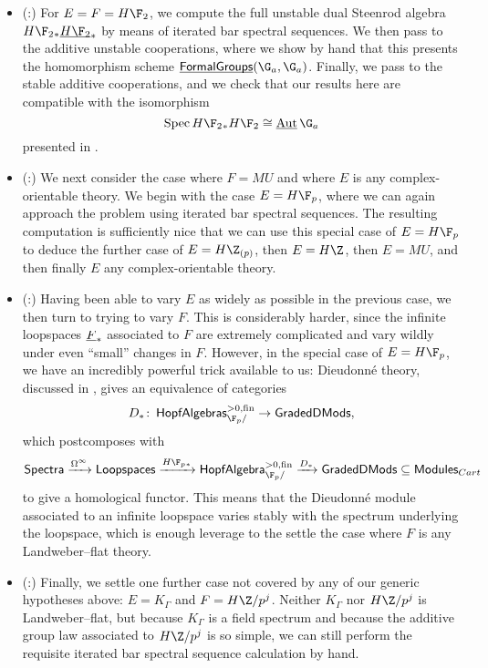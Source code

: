 \begin{itemize}
\item (:) For $E = F = H\F_2$, we compute the full unstable dual Steenrod algebra $H\F_2{}_* \OS{H\F_2}{*}$ by means of iterated bar spectral sequences.  We then pass to the additive unstable cooperations, where we show by hand that this presents the homomorphism scheme $\InternalHom{FormalGroups}(\G_a, \G_a)$.  Finally, we pass to the stable additive cooperations, and we check that our results here are compatible with the isomorphism \[\Spec H\F_2{}_* H\F_2 \cong \InternalAut{\G_a}\] presented in .
\item (:) We next consider the case where $F = MU$ and where $E$ is any complex-orientable theory.  We begin with the case $E = H\F_p$, where we can again approach the problem using iterated bar spectral sequences.  The resulting computation is sufficiently nice that we can use this special case of $E = H\F_p$ to deduce the further case of $E = H\Z_{(p)}$, then $E = H\Z$, then $E = MU$, and then finally $E$ any complex-orientable theory.
\item (:) Having been able to vary $E$ as widely as possible in the previous case, we then turn to trying to vary $F$.  This is considerably harder, since the infinite loopspaces $\underline{\smash{F}}_{*}$ associated to $F$ are extremely complicated and vary wildly under even ``small'' changes in $F$.  However, in the special case of $E = H\F_p$, we have an incredibly powerful trick available to us: Dieudonn\'e theory, discussed in , gives an equivalence of categories \[D_*\co \CatOf{HopfAlgebras}^{> 0, \fin}_{\F_p/} \to \CatOf{GradedDMods},\] which postcomposes with \[\CatOf{Spectra} \xrightarrow{\Loops^\infty} \CatOf{Loopspaces} \xrightarrow{H\F_p{}_*} \CatOf{HopfAlgebra}^{>0, \fin}_{\F_p/} \xrightarrow{D_*} \CatOf{GradedDMods} \subseteq \CatOf{Modules}_{Cart}\]  to give a homological functor.  This means that the Dieudonn\'e module associated to an infinite loopspace varies stably with the spectrum underlying the loopspace, which is enough leverage to the settle the case where $F$ is any Landweber--flat theory.
\item (:) Finally, we settle one further case not covered by any of our generic hypotheses above: $E = K_\Gamma$ and $F = H\Z/p^j$.  Neither $K_\Gamma$ nor $H\Z/p^j$ is Landweber--flat, but because $K_\Gamma$ is a field spectrum and because the additive group law associated to $H\Z/p^j$ is so simple, we can still perform the requisite iterated bar spectral sequence calculation by hand.
\end{itemize}

